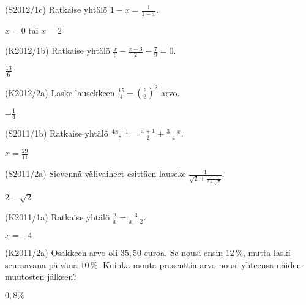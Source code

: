 \begin{tehtava}(S2012/1c)  Ratkaise yhtälö $1-x=\frac{1}{1-x}$.
			\begin{vastaus}
				$x=0$ tai $x=2$
				\end{vastaus}
\end{tehtava}

\begin{tehtava}(K2012/1b)  Ratkaise yhtälö $\frac{x}{6} - \frac{x-3}{2} - \frac{7}{9} = 0$. 
                        \begin{vastaus}
				$\frac{13}{6}$
			\end{vastaus}
\end{tehtava}

\begin{tehtava}(K2012/2a) Laske lausekkeen $ \frac{15}{4} - \left( \frac{6}{3} \right)^2 $ arvo.
\begin{vastaus}
				$-\frac{1}{4}$
				\end{vastaus}
\end{tehtava}

\begin{tehtava}(S2011/1b) Ratkaise yhtälö $\frac{4x - 1}{5} = \frac{x + 1}{2} + \frac{3 - x}{4}$.
                        \begin{vastaus}
				$x=\frac{29}{11}$
				\end{vastaus}
\end{tehtava}

\begin{tehtava}(S2011/2a) Sievennä välivaiheet esittäen lauseke $\frac{1}{\sqrt{2} + \frac{1}{2 + \sqrt{2}}}$.
                     \begin{vastaus}
				$2-\sqrt{2}$
				\end{vastaus}
\end{tehtava}


\begin{tehtava}(K2011/1a) Ratkaise yhtälö $\frac{2}{x} = \frac{3}{x - 2}$.
\begin{vastaus}
				$x=-4$
				\end{vastaus}
\end{tehtava}

\begin{tehtava}(K2011/2a) Osakkeen arvo oli $35,50$ euroa. Se nousi ensin $12\,\%$, mutta laski seuraavana päivänä $10\,\%$. Kuinka monta prosenttia arvo nousi yhteensä näiden muutosten jälkeen?
  \begin{vastaus} $0,8\%$
  \end{vastaus}
\end{tehtava}


